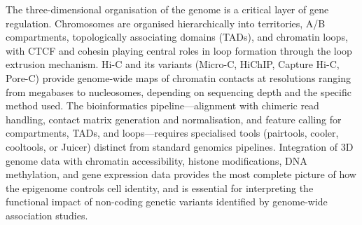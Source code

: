 The three-dimensional organisation of the genome is a critical layer of gene regulation. Chromosomes are organised hierarchically into territories, A/B compartments, topologically associating domains (TADs), and chromatin loops, with CTCF and cohesin playing central roles in loop formation through the loop extrusion mechanism. Hi-C and its variants (Micro-C, HiChIP, Capture Hi-C, Pore-C) provide genome-wide maps of chromatin contacts at resolutions ranging from megabases to nucleosomes, depending on sequencing depth and the specific method used. The bioinformatics pipeline---alignment with chimeric read handling, contact matrix generation and normalisation, and feature calling for compartments, TADs, and loops---requires specialised tools (pairtools, cooler, cooltools, or Juicer) distinct from standard genomics pipelines. Integration of 3D genome data with chromatin accessibility, histone modifications, DNA methylation, and gene expression data provides the most complete picture of how the epigenome controls cell identity, and is essential for interpreting the functional impact of non-coding genetic variants identified by genome-wide association studies.

